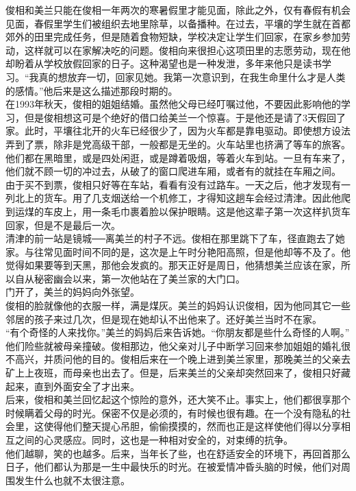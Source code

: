 \begin{multicols}{\theparacolNo}
俊相和美兰只能在俊相一年两次的寒暑假里才能见面，除此之外，仅有春假有机会见面，春假里学生们被组织去地里除草，以备播种。在过去，平壤的学生就在首都郊外的田里完成任务，但是随着食物短缺，学校决定让学生们回家，在家乡参加劳动，这样就可以在家解决吃的问题。俊相向来很担心这项田里的志愿劳动，现在他却盼着从学校放假回家的日子。这种渴望也是一种发泄，多年来他只是读书学习。“我真的想放弃一切，回家见她。我第一次意识到，在我生命里什么才是人类的感情。”他后来是这么描述那段时期的。\\

在1993年秋天，俊相的姐姐结婚。虽然他父母已经叮嘱过他，不要因此影响他的学习，但是俊相想这可是个绝好的借口给美兰一个惊喜。于是他还是请了3天假回了家。此时，平壤往北开的火车已经很少了，因为火车都是靠电驱动。即使想方设法弄到了票，除非是党高级干部，一般都是无坐的。火车站里也挤满了等车的旅客。他们都在黑暗里，或是四处闲逛，或是蹲着吸烟，等着火车到站。一旦有车来了，他们就不顾一切的冲过去，从破了的窗口爬进车厢，或者有的就挂在车厢之间。\\

由于买不到票，俊相只好等在车站，看看有没有过路车。一天之后，他才发现有一列北上的货车。用了几支烟送给一个机修工，才得知这趟车会经过清津。因此他爬到运煤的车皮上，用一条毛巾裹着脸以保护眼睛。这是他这辈子第一次这样扒货车回家，但是不是最后一次。\\

清津的前一站是镜城──离美兰的村子不远。俊相在那里跳下了车，径直跑去了她家。与往常见面时间不同的是，这次是上午时分艳阳高照，但是他却等不及了。他觉得如果要等到天黑，那他会发疯的。那天正好是周日，他猜想美兰应该在家，所以自从秘密幽会以来，第一次他站在了美兰家的大门口。\\

门开了，美兰的妈妈向外张望。\\

俊相的脸就像他的衣服一样，满是煤灰。美兰的妈妈认识俊相，因为他同其它一些邻居的孩子来过几次，但是现在她却认不出他来了。还好美兰当时不在家。\\

“有个奇怪的人来找你。”美兰的妈妈后来告诉她。“你朋友都是些什么奇怪的人啊。”\\

他们险些就被母亲撞破。俊相那边，他父亲对儿子中断学习回来参加姐姐的婚礼很不高兴，并质问他的目的。俊相后来在一个晚上进到美兰家里，那晚美兰的父亲去矿上上夜班，而母亲也出去了。但是，后来美兰的父亲却突然回来了，俊相只好藏起来，直到外面安全了才出来。\\

后来，俊相和美兰回忆起这个惊险的意外，还大笑不止。事实上，他们都很享那个时候瞒着父母的时光。保密不仅是必须的，有时候也很有趣。在一个没有隐私的社会里，这使得他们整天提心吊胆，偷偷摸摸的，然而也正是这样使他们得以分享相互之间的心灵感应。同时，这也是一种相对安全的，对束缚的抗争。\\

他们越聊，笑的也越多。后来，当年长了些，也在舒适安全的环境下，再回首那么日子，他们都认为那是一生中最快乐的时光。在被爱情冲昏头脑的时候，他们对周围发生什么也就不太很注意。\\
\ifnum{}
	\end{multicols}
\fi